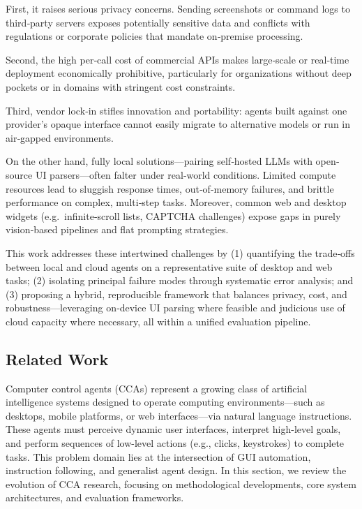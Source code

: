 \documentclass[runningheads]{llncs}
\begin{document}
First, it raises serious privacy concerns. Sending screenshots or command logs to third‐party servers exposes potentially sensitive data and conflicts with regulations or corporate policies that mandate on‐premise processing.  

Second, the high per‐call cost of commercial APIs makes large‐scale or real‐time deployment economically prohibitive, particularly for organizations without deep pockets or in domains with stringent cost constraints.  

Third, vendor lock‐in stifles innovation and portability: agents built against one provider’s opaque interface cannot easily migrate to alternative models or run in air‐gapped environments.

On the other hand, fully local solutions—pairing self‐hosted LLMs with open‐source UI parsers—often falter under real‐world conditions. Limited compute resources lead to sluggish response times, out‐of‐memory failures, and brittle performance on complex, multi‐step tasks. Moreover, common web and desktop widgets (e.g.\ infinite‐scroll lists, CAPTCHA challenges) expose gaps in purely vision‐based pipelines and flat prompting strategies.

This work addresses these intertwined challenges by (1) quantifying the trade‐offs between local and cloud agents on a representative suite of desktop and web tasks; (2) isolating principal failure modes through systematic error analysis; and (3) proposing a hybrid, reproducible framework that balances privacy, cost, and robustness—leveraging on‐device UI parsing where feasible and judicious use of cloud capacity where necessary, all within a unified evaluation pipeline.  

\subsection{Related Work}

Computer control agents (CCAs) represent a growing class of artificial intelligence systems designed to operate computing environments—such as desktops, mobile platforms, or web interfaces—via natural language instructions. These agents must perceive dynamic user interfaces, interpret high-level goals, and perform sequences of low-level actions (e.g., clicks, keystrokes) to complete tasks. This problem domain lies at the intersection of GUI automation, instruction following, and generalist agent design. In this section, we review the evolution of CCA research, focusing on methodological developments, core system architectures, and evaluation frameworks.
\end{document}
